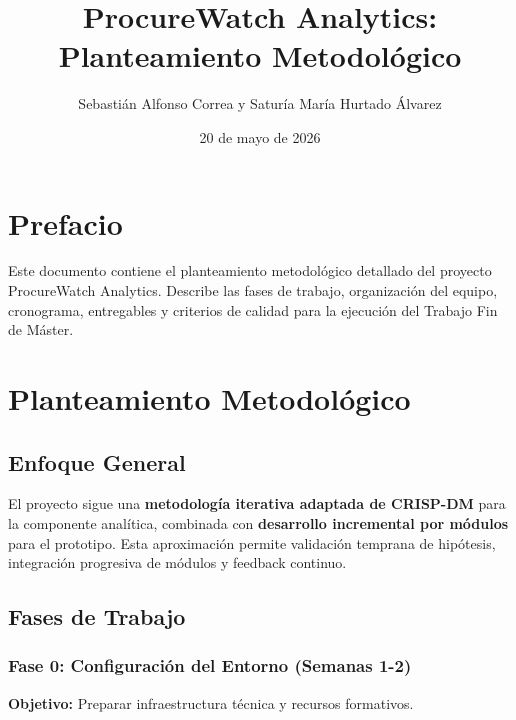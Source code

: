 \documentclass[11pt,a4paper,spanish]{book}
\title{ProcureWatch Analytics: Planteamiento Metodológico}
\author{Sebastián Alfonso Correa y Saturía María Hurtado Álvarez}
\date{20 de mayo de 2026}
\numberwithin{equation}{chapter}
\numberwithin{figure}{chapter}
\begin{document}
\renewcommand{\listfigurename}{Índice de Ilustraciones}
\renewcommand{\listtablename}{Índice de Tablas}
\renewcommand{\contentsname}{Índice de Contenidos}
\renewcommand{\figurename}{Figura}
\renewcommand{\tablename}{Tabla}

\maketitle

\frontmatter
\tableofcontents
\listoffigures
\listoftables

\chapter{Prefacio}

Este documento contiene el planteamiento metodológico detallado del proyecto ProcureWatch Analytics. Describe las fases de trabajo, organización del equipo, cronograma, entregables y criterios de calidad para la ejecución del Trabajo Fin de Máster.

\mainmatter

\chapter{Planteamiento Metodológico}

\section{Enfoque General}

El proyecto sigue una \textbf{metodología iterativa adaptada de CRISP-DM} para la componente analítica, combinada con \textbf{desarrollo incremental por módulos} para el prototipo. Esta aproximación permite validación temprana de hipótesis, integración progresiva de módulos y feedback continuo.

\section{Fases de Trabajo}

\subsection{Fase 0: Configuración del Entorno (Semanas 1-2)}

\textbf{Objetivo:} Preparar infraestructura técnica y recursos formativos.
\end{document}
